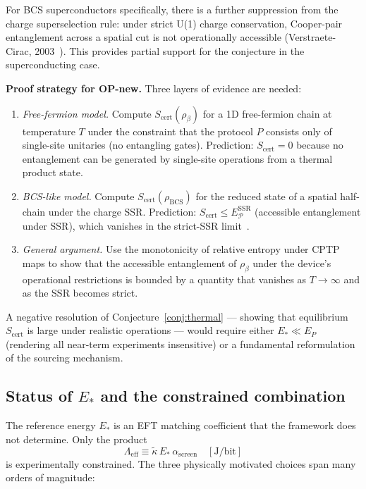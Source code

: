 \documentclass[11pt]{article}
\theoremstyle{plain}
\theoremstyle{definition}
\theoremstyle{remark}
\begin{document}
For BCS superconductors specifically, there is a further suppression from the
charge superselection rule: under strict U(1) charge conservation, Cooper-pair
entanglement across a spatial cut is not operationally accessible
(Verstraete-Cirac, 2003~\cite{Verstraete2003}).  This provides partial
support for the conjecture in the superconducting case.

\textbf{Proof strategy for OP-new.}  Three layers of evidence are needed:
\begin{enumerate}[noitemsep]
  \item \textit{Free-fermion model.}  Compute $S_{\mathrm{cert}}(\rho_\beta)$
    for a 1D free-fermion chain at temperature $T$ under the constraint that
    the protocol $P$ consists only of single-site unitaries (no entangling gates).
    Prediction: $S_{\mathrm{cert}} = 0$ because no entanglement can be generated
    by single-site operations from a thermal product state.
  \item \textit{BCS-like model.}  Compute $S_{\mathrm{cert}}(\rho_{\mathrm{BCS}})$
    for the reduced state of a spatial half-chain under the charge SSR.
    Prediction: $S_{\mathrm{cert}} \leq E_{\mathcal{P}}^{\mathrm{SSR}}$ (accessible
    entanglement under SSR), which vanishes in the strict-SSR limit~\cite{Wiseman2003}.
  \item \textit{General argument.}  Use the monotonicity of relative entropy under
    CPTP maps to show that the accessible entanglement of $\rho_\beta$ under
    the device's operational restrictions is bounded by a quantity that vanishes
    as $T\to\infty$ and as the SSR becomes strict.
\end{enumerate}

A negative resolution of Conjecture~\ref{conj:thermal} --- showing that equilibrium
$S_{\mathrm{cert}}$ is large under realistic operations --- would require either
$E_* \ll E_P$ (rendering all near-term experiments insensitive) or a fundamental
reformulation of the sourcing mechanism.

\subsection{Status of $E_*$ and the constrained combination}
\label{sec:Estar}

The reference energy $E_*$ is an EFT matching coefficient that the framework does not
determine.  Only the product
\begin{equation}
  \Lambda_{\mathrm{eff}} \equiv \tilde{\kappa}\,E_*\,\alpha_{\mathrm{screen}}
  \quad [\mathrm{J/bit}]
\end{equation}
is experimentally constrained.  The three physically motivated choices span many orders
of magnitude:
\end{document}
